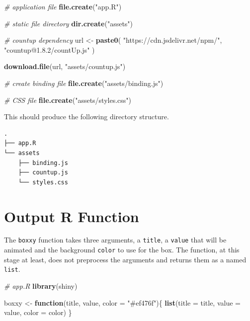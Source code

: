 \documentclass[
]{krantz}
\makeatletter
\newenvironment{Shaded}{\begin{snugshade}}{\end{snugshade}}
\newcommand{\CommentTok}[1]{\textcolor[rgb]{0.37,0.37,0.37}{\textit{#1}}}
\newcommand{\ControlFlowTok}[1]{\textcolor[rgb]{0.27,0.27,0.27}{\textbf{#1}}}
\newcommand{\DataTypeTok}[1]{\textcolor[rgb]{0.27,0.27,0.27}{#1}}
\newcommand{\KeywordTok}[1]{\textcolor[rgb]{0.27,0.27,0.27}{\textbf{#1}}}
\newcommand{\NormalTok}[1]{#1}
\newcommand{\StringTok}[1]{\textcolor[rgb]{0.5,0.5,0.5}{#1}}
\newenvironment{kframe}{%
\medskip{}
\setlength{\fboxsep}{.8em}
 \def\at@end@of@kframe{}%
 \ifinner\ifhmode%
  \def\at@end@of@kframe{\end{minipage}}%
  \begin{minipage}{\columnwidth}%
 \fi\fi%
 \def\FrameCommand##1{\hskip\@totalleftmargin \hskip-\fboxsep
 \colorbox{shadecolor}{##1}\hskip-\fboxsep
     \hskip-\linewidth \hskip-\@totalleftmargin \hskip\columnwidth}%
 \MakeFramed {\advance\hsize-\width
   \@totalleftmargin\z@ \linewidth\hsize
   \@setminipage}}%
 {\par\unskip\endMakeFramed%
 \at@end@of@kframe}
\renewenvironment{Shaded}{\begin{kframe}}{\end{kframe}}
\makeatother
\begin{document}
\begin{Shaded}
\begin{Highlighting}[]
\CommentTok{\# application file}
\KeywordTok{file.create}\NormalTok{(}\StringTok{"app.R"}\NormalTok{)}

\CommentTok{\# static file directory}
\KeywordTok{dir.create}\NormalTok{(}\StringTok{"assets"}\NormalTok{)}

\CommentTok{\# countup dependency}
\NormalTok{url <{-}}\StringTok{ }\KeywordTok{paste0}\NormalTok{(}
  \StringTok{"https://cdn.jsdelivr.net/npm/"}\NormalTok{,}
  \StringTok{"countup@1.8.2/countUp.js"}
\NormalTok{)}

\KeywordTok{download.file}\NormalTok{(url, }\StringTok{"assets/countup.js"}\NormalTok{)}

\CommentTok{\# create binding file}
\KeywordTok{file.create}\NormalTok{(}\StringTok{"assets/binding.js"}\NormalTok{)}

\CommentTok{\# CSS file}
\KeywordTok{file.create}\NormalTok{(}\StringTok{"assets/styles.css"}\NormalTok{)}
\end{Highlighting}
\end{Shaded}

This should produce the following directory structure.

\begin{verbatim}
.
├── app.R
└── assets
    ├── binding.js
    ├── countup.js
    └── styles.css
\end{verbatim}

\hypertarget{shiny-output-r-fun}{%
\section{Output R Function}\label{shiny-output-r-fun}}

The \texttt{boxxy} function takes three arguments, a \texttt{title}, a \texttt{value} that will be animated and the background \texttt{color} to use for the box. The function, at this stage at least, does not preprocess the arguments and returns them as a named \texttt{list}.

\begin{Shaded}
\begin{Highlighting}[]
\CommentTok{\# app.R}
\KeywordTok{library}\NormalTok{(shiny)}

\NormalTok{boxxy <{-}}\StringTok{ }\ControlFlowTok{function}\NormalTok{(title, value, }\DataTypeTok{color =} \StringTok{"\#ef476f"}\NormalTok{)\{}
  \KeywordTok{list}\NormalTok{(}\DataTypeTok{title =}\NormalTok{ title, }\DataTypeTok{value =}\NormalTok{ value, }\DataTypeTok{color =}\NormalTok{ color)}
\NormalTok{\}}
\end{Highlighting}
\end{Shaded}
\end{document}
